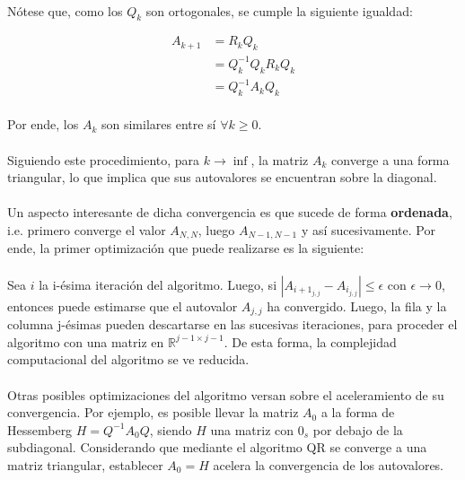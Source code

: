 \documentclass[12pt, twocolumn]{article}
\begin{document}
	\paragraph{} Nótese que, como los $Q_{k}$ son ortogonales, se cumple la siguiente igualdad:
	
	\begin{align*}
		A_{k+1} &= R_{k}Q_{k}  \\ &= Q^{-1}_{k}Q_{k}R_{k}Q_{k} \\ &= Q^{-1}_{k}A_{k}Q_{k}
	\end{align*}
	
	\paragraph{} Por ende, los $A_{k}$ son similares entre sí $\forall k\ge0$.
	
	\paragraph{} Siguiendo este procedimiento, para $k\to\inf$, la matriz $A_{k}$ converge a una forma triangular, lo que implica que sus autovalores se encuentran sobre la diagonal.
	
	\paragraph{} Un aspecto interesante de dicha convergencia es que sucede de forma \textbf{ordenada}, i.e. primero converge el valor $A_{N,N}$, luego $A_{N-1,N-1}$ y así sucesivamente. Por ende, la primer optimización que puede realizarse es la siguiente: 
	
	\paragraph{} Sea $i$ la i-ésima iteración del algoritmo. Luego, si $|A_{i+1_{j,j}} -A_{i_{j,j}}| \le \epsilon$ con $\epsilon \to 0$, entonces puede estimarse que el autovalor $A_{j,j}$ ha convergido. Luego, la fila y la columna j-ésimas pueden descartarse en las sucesivas iteraciones, para proceder el algoritmo con una matriz en $\mathbb{R}^{j-1 \times j-1}$. De esta forma, la complejidad computacional del algoritmo se ve reducida.
	
	\paragraph{} Otras posibles optimizaciones del algoritmo versan sobre el aceleramiento de su convergencia. Por ejemplo, es posible llevar la matriz $A_{0}$ a la forma de Hessemberg $H = Q^{-1}A_{0}Q$, siendo $H$ una matriz con $0_{s}$ por debajo de la subdiagonal. Considerando que mediante el algoritmo QR se converge a una matriz triangular, establecer $A_{0} = H$ acelera la convergencia de los autovalores.
	
\end{document}
